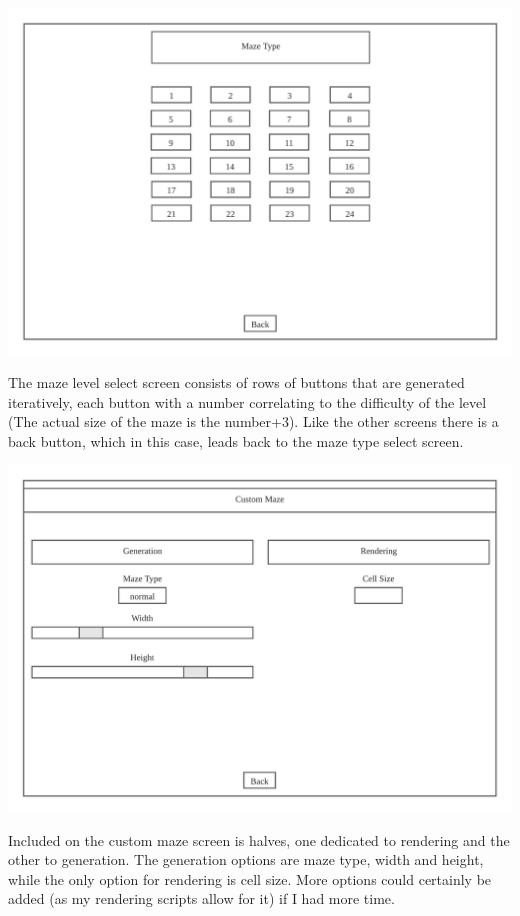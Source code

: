 \documentclass{article}
\begin{document}
\clearpage
\begin{center}
	\includegraphics[scale=0.7]{Maze Level Select}

	The maze level select screen consists of rows of buttons that are generated iteratively, each button with a number correlating to the difficulty of the level
	(The actual size of the maze is the number+3). Like the other screens there is a back button, which in this case, leads back to the maze type select screen.
\end{center}
\begin{center}
	\includegraphics[scale=0.7]{Custom Maze Screen}

	Included on the custom maze screen is halves, one dedicated to rendering and the other to generation. The generation options are maze type, width
	and height, while the only option for rendering is cell size. More options could certainly be added (as my rendering scripts allow for it) if I had more time.
\end{center}
\clearpage
\end{document}

